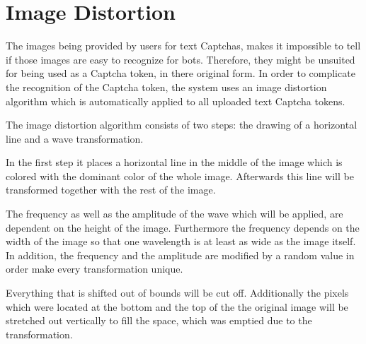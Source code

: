 \section{Image Distortion}
\label{sec:image_distortion}

The images being provided by users for text Captchas, makes it impossible to tell if those images are easy to recognize for bots. Therefore, they might be unsuited for being used as a Captcha token, in there original form. In order to complicate the recognition of the Captcha token, the system uses an image distortion algorithm which is automatically applied to all uploaded text Captcha tokens.

The image distortion algorithm consists of two steps: the drawing of a horizontal line and a wave transformation.

In the first step it places a horizontal line in the middle of the image which is colored with the dominant color of the whole image. Afterwards this line will be transformed together with the rest of the image.

The frequency as well as the amplitude of the wave which will be applied, are dependent on the height of the image. Furthermore the frequency depends on the width of the image so that one wavelength is at least as wide as the image itself. In addition, the frequency and the amplitude are modified by a random value in order make every transformation unique.

Everything that is shifted out of bounds will be cut off. Additionally the pixels which were located at the bottom and the top of the the original image will be stretched out vertically to fill the space, which was emptied due to the transformation.

\clearpage
